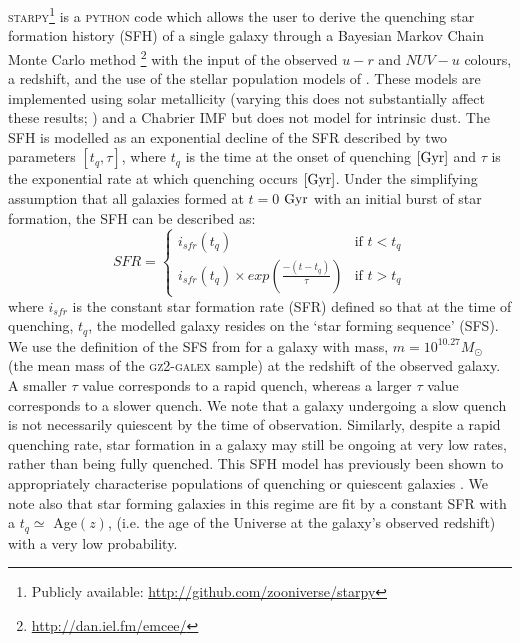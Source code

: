 \documentclass[useAMS,usenatbib]{mn2e}
\begin{document}
\textsc{starpy}\footnote{Publicly available: \url{http://github.com/zooniverse/starpy}} is a \textsc{python} code which allows the user to derive the quenching star formation history (SFH) of a single galaxy through a Bayesian Markov Chain Monte Carlo method \citep{emcee13}\footnote{\url{http://dan.iel.fm/emcee/}} with the input of the observed $u-r$ and $NUV-u$ colours, a redshift, and the use of the stellar population models of \cite{BC03}.  These models are implemented using solar metallicity (varying this does not substantially affect these results; \citealt{smethurst15}) and a Chabrier IMF \citep{chabrier03} but does not model for intrinsic dust. The SFH is modelled as an exponential decline of the SFR described by two parameters $[t_{q}, \tau]$, where $t_{q}$ is the time at the onset of quenching $\rm{[Gyr]}$ and $\tau$ is the exponential rate at which quenching occurs $\rm{[Gyr]}$. Under the simplifying assumption that all galaxies formed at $t=0$ $\rm{ Gyr}$ with an initial burst of star formation, the SFH can be described as: 
\begin{equation}\label{sfh}
SFR =
\begin{cases}
i_{sfr}(t_{q}) & \text{if } t < t_{q} \\
i_{sfr}(t_{q}) \times exp{\left( \frac{-(t-t_{q})}{\tau}\right)} & \text{if } t > t_{q} 
\end{cases}
\end{equation}
where $i_{sfr}$ is the constant star formation rate (SFR) defined so that at the time of quenching, $t_{q}$, the modelled galaxy resides on the `star forming sequence' (SFS). We use the definition of the SFS from \cite{peng10} for a galaxy with mass, $m = 10^{10.27} M_{\odot}$ (the mean mass of the \textsc{gz2-galex} sample) at the redshift of the observed galaxy.  A smaller $\tau$ value corresponds to a rapid quench, whereas a larger $\tau$ value corresponds to a slower quench. We note that a galaxy undergoing a slow quench is not necessarily quiescent by the time of observation. Similarly, despite a rapid quenching rate, star formation in a galaxy may still be ongoing at very low rates, rather than being fully quenched. This SFH model has previously been shown to appropriately characterise populations of quenching or quiescent galaxies \citep{Weiner06, Martin07, Noeske07,schawinski14}. We note also that star forming galaxies in this regime are fit by a constant SFR with a $t_{q} \simeq$ Age$(z)$, (i.e. the age of the Universe at the galaxy's observed redshift) with a very low probability.
\end{document}
